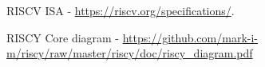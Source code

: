 \documentclass{article}
\begin{document}
\begin{thebibliography}{9}

 RISCV ISA -  \url{https://riscv.org/specifications/}.

 RISCY Core diagram -
    \url{https://github.com/mark-i-m/riscy/raw/master/riscy/doc/riscy_diagram.pdf}


\end{thebibliography}
\end{document}
